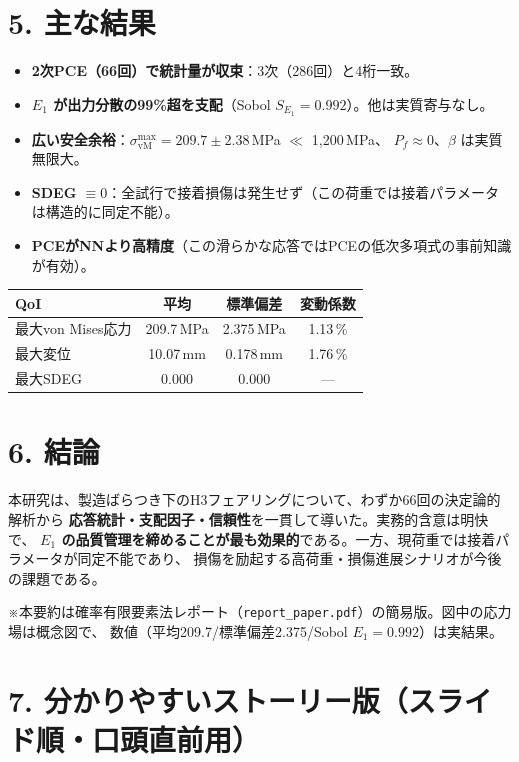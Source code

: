 \documentclass[11pt,a4paper]{ltjsarticle}
\begin{document}
\section*{5. 主な結果}
\begin{itemize}\itemsep1pt
  \item \textbf{2次PCE（66回）で統計量が収束}：3次（286回）と4桁一致。
  \item \textbf{$E_1$ が出力分散の99\%超を支配}（Sobol $S_{E_1}=0.992$）。他は実質寄与なし。
  \item \textbf{広い安全余裕}：$\sigma_\mathrm{vM}^{\max}=209.7\pm2.38$\,MPa $\ll$ 1{,}200\,MPa、
        $P_f\approx0$、$\beta$ は実質無限大。
  \item \textbf{SDEG $\equiv 0$}：全試行で接着損傷は発生せず（この荷重では接着パラメータは構造的に同定不能）。
  \item \textbf{PCEがNNより高精度}（この滑らかな応答ではPCEの低次多項式の事前知識が有効）。
\end{itemize}

\begin{table}[h]\centering\small
\begin{tabular}{lccc}
\toprule
QoI & 平均 & 標準偏差 & 変動係数 \\
\midrule
最大von Mises応力 & 209.7\,MPa & 2.375\,MPa & 1.13\,\% \\
最大変位          & 10.07\,mm  & 0.178\,mm  & 1.76\,\% \\
最大SDEG          & 0.000      & 0.000      & ---       \\
\bottomrule
\end{tabular}
\end{table}

\section*{6. 結論}
本研究は、製造ばらつき下のH3フェアリングについて、わずか66回の決定論的解析から
\textbf{応答統計・支配因子・信頼性}を一貫して導いた。実務的含意は明快で、
\textbf{$E_1$ の品質管理を締めることが最も効果的}である。一方、現荷重では接着パラメータが同定不能であり、
損傷を励起する高荷重・損傷進展シナリオが今後の課題である。

\vfill
{\footnotesize ※本要約は確率有限要素法レポート（\texttt{report\_paper.pdf}）の簡易版。図中の応力場は概念図で、
数値（平均209.7/標準偏差2.375/Sobol $E_1=0.992$）は実結果。}

\clearpage
\section*{7. 分かりやすいストーリー版（スライド順・口頭直前用）}
\end{document}
